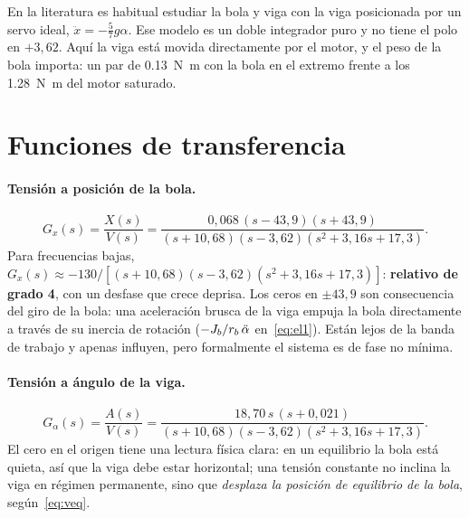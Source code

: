 \begin{nota}
En la literatura es habitual estudiar la bola y viga con la viga posicionada por un servo ideal, $\ddot x=-\tfrac57g\alpha$. Ese modelo es un doble integrador puro y no tiene el polo en $+3{,}62$. Aquí la viga está movida directamente por el motor, y el peso de la bola importa: un par de \SI{0.13}{N.m} con la bola en el extremo frente a los \SI{1.28}{N.m} del motor saturado.
\end{nota}

\section{Funciones de transferencia}

\paragraph{Tensión a posición de la bola.}
\begin{equation}
  G_x(s)=\frac{X(s)}{V(s)} = \frac{0{,}068\,(s-43{,}9)(s+43{,}9)}{(s+10{,}68)(s-3{,}62)(s^2+3{,}16s+17{,}3)} .
\end{equation}
Para frecuencias bajas, $G_x(s)\approx-130/[(s+10{,}68)(s-3{,}62)(s^2+3{,}16s+17{,}3)]$: \textbf{relativo de grado 4}, con un desfase que crece deprisa. Los ceros en $\pm43{,}9$ son consecuencia del giro de la bola: una aceleración brusca de la viga empuja la bola directamente a través de su inercia de rotación ($-J_b/r_b\,\ddot{\alpha}$ en~\eqref{eq:el1}). Están lejos de la banda de trabajo y apenas influyen, pero formalmente el sistema es de fase no mínima.

\paragraph{Tensión a ángulo de la viga.}
\begin{equation}
  G_\alpha(s)=\frac{A(s)}{V(s)} = \frac{18{,}70\,s\,(s+0{,}021)}{(s+10{,}68)(s-3{,}62)(s^2+3{,}16s+17{,}3)} .
\end{equation}
El cero en el origen tiene una lectura física clara: en un equilibrio la bola está quieta, así que la viga debe estar horizontal; una tensión constante no inclina la viga en régimen permanente, sino que \emph{desplaza la posición de equilibrio de la bola}, según~\eqref{eq:veq}.

